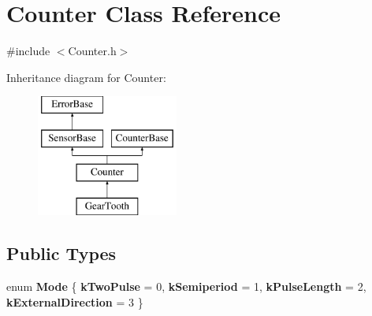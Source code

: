 \hypertarget{classCounter}{\section{\-Counter \-Class \-Reference}
\label{classCounter}
}


{\ttfamily \#include $<$\-Counter.\-h$>$}

\-Inheritance diagram for \-Counter\-:\begin{figure}[H]
\begin{center}
\leavevmode
\includegraphics[height=4.000000cm]{classCounter}
\end{center}
\end{figure}
\subsection*{\-Public \-Types}
\begin{DoxyCompactItemize}
\item 
enum {\bfseries \-Mode} \{ {\bfseries k\-Two\-Pulse} = 0, 
{\bfseries k\-Semiperiod} = 1, 
{\bfseries k\-Pulse\-Length} = 2, 
{\bfseries k\-External\-Direction} = 3
 \}
\end{DoxyCompactItemize}
